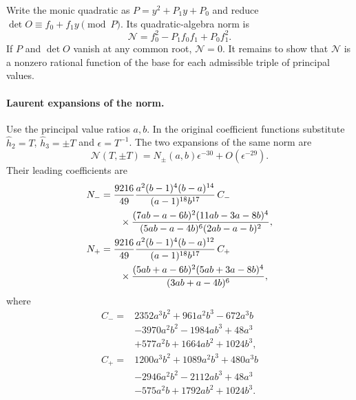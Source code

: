 \documentclass[11pt,a4paper]{article}
\numberwithin{equation}{section}
\theoremstyle{plain}
\theoremstyle{definition}
\theoremstyle{remark}
\begin{document}
Write the monic quadratic as $P=y^2+P_1y+P_0$ and reduce
$\det O\equiv f_0+f_1y\pmod P$.  Its quadratic-algebra norm is
\begin{equation}\label{appr3tau:norm}
 \mathcal N=f_0^2-P_1f_0f_1+P_0f_1^2.
\end{equation}
If $P$ and $\det O$ vanish at any common root, $\mathcal N=0$.
It remains to show that $\mathcal N$ is a nonzero
rational function of the base for each admissible triple of principal values.

\paragraph{Laurent expansions of the norm.}
Use the principal value ratios $a,b$.  In the original
coefficient functions substitute $\widehat h_2 =T$, $\widehat h_3 =\pm T$ and
$\epsilon=T^{-1}$.  The two expansions of the same norm are
\begin{equation}\label{appr3tau:laurent}
 \mathcal N(T,\pm T)
   =N_\pm(a,b)\epsilon^{-30}+O(\epsilon^{-29}).
\end{equation}
Their leading coefficients are
\begin{align}
 N_-&=\frac{9216}{49}
 \frac{a^2(b-1)^4(b-a)^{14}}
      {(a-1)^{18}b^{17}}\,C_-\notag\\
 &\qquad\times
 \frac{(7ab-a-6b)^2(11ab-3a-8b)^4}
      {(5ab-a-4b)^6(2ab-a-b)^2},
 \label{appr3tau:negative}\\
 N_+&=\frac{9216}{49}
 \frac{a^2(b-1)^4(b-a)^{12}}
      {(a-1)^{18}b^{17}}\,C_+\notag\\
 &\qquad\times
 \frac{(5ab+a-6b)^2(5ab+3a-8b)^4}
      {(3ab+a-4b)^6},
 \label{appr3tau:positive}
\end{align}
where
\begin{align*}
 C_-={}&2352a^3b^2+961a^2b^3-672a^3b\\
       &-3970a^2b^2-1984ab^3+48a^3\\
       &+577a^2b+1664ab^2+1024b^3,\\
 C_+={}&1200a^3b^2+1089a^2b^3+480a^3b\\
       &-2946a^2b^2-2112ab^3+48a^3\\
       &-575a^2b+1792ab^2+1024b^3.
\end{align*}
\end{document}
